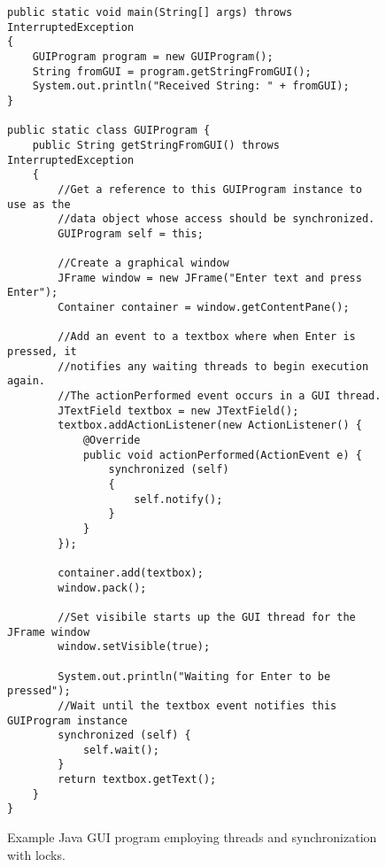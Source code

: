 \documentclass{sig-alternate}
\begin{document}
\begin{figure}
\begin{lstlisting}
public static void main(String[] args) throws InterruptedException
{
    GUIProgram program = new GUIProgram();
    String fromGUI = program.getStringFromGUI();
    System.out.println("Received String: " + fromGUI);
}

public static class GUIProgram {
    public String getStringFromGUI() throws InterruptedException
    {
        //Get a reference to this GUIProgram instance to use as the
        //data object whose access should be synchronized.
        GUIProgram self = this;

        //Create a graphical window
        JFrame window = new JFrame("Enter text and press Enter");
        Container container = window.getContentPane();

        //Add an event to a textbox where when Enter is pressed, it
        //notifies any waiting threads to begin execution again.
        //The actionPerformed event occurs in a GUI thread.
        JTextField textbox = new JTextField();
        textbox.addActionListener(new ActionListener() {
            @Override
            public void actionPerformed(ActionEvent e) {
                synchronized (self)
                {
                    self.notify();
                }
            }
        });

        container.add(textbox);
        window.pack();

        //Set visibile starts up the GUI thread for the JFrame window
        window.setVisible(true);

        System.out.println("Waiting for Enter to be pressed");
        //Wait until the textbox event notifies this GUIProgram instance
        synchronized (self) {
            self.wait();
        }
        return textbox.getText();
    }
}
\end{lstlisting}
\caption{Example Java GUI program employing threads and synchronization with locks.}
\label{fig:locks}
\end{figure}

\end{document}
